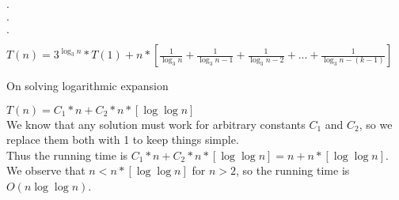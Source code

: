 \documentclass[18 pt]{article}
\begin{document}
$.$

$.$

$.$

$T(n) = 3^{\log_3{n}}*T(1) + n*\left[\frac{1}{\log_3{n}}+ \frac{1}{\log_3{n}-1}+ \frac{1}{\log_3{n}-2}+...+\frac{1}{\log_3{n}-(k-1)} \right] $

On solving logarithmic expansion

$T(n) = C_1*n + C_2*n*\left[\log{\log{n}} \right]$\\

We know that any solution must work for arbitrary constants $C_1$ and $C_2$, so we replace them both with 1 to keep things simple. \\

Thus the running time is $C_1*n + C_2*n*\left[\log{\log{n}} \right]=n + n*\left[\log{\log{n}} \right]$. We observe that $ n < n*\left[\log{\log{n}} \right]$ for $n>2$, so the running time is $O(n\log{\log{n}})$.
\end{document}
